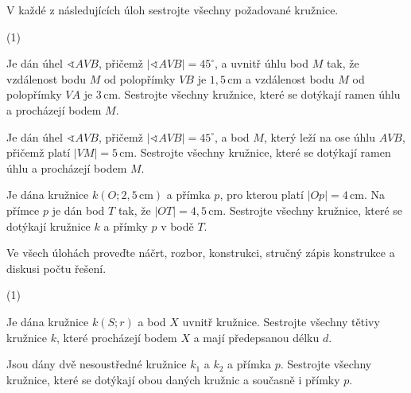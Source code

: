\documentclass[12pt,a4paper]{article}
\begin{document}

\begin{exercise}

    V každé z následujících úloh sestrojte všechny požadované kružnice.

    \begin{tasks}(1)

        \task Je dán úhel $\sphericalangle AVB$, přičemž $|\sphericalangle AVB|=45^\circ$, a uvnitř úhlu bod $M$ tak, že vzdálenost bodu $M$ od polopřímky $VB$ je $1{,}5\,\mathrm{cm}$ a vzdálenost bodu $M$ od polopřímky $VA$ je $3\,\mathrm{cm}$.
        Sestrojte všechny kružnice, které se dotýkají ramen úhlu a procházejí bodem $M$.

        \task Je dán úhel $\sphericalangle AVB$, přičemž $|\sphericalangle AVB|=45^\circ$, a bod $M$, který leží na ose úhlu $AVB$, přičemž platí $|VM|=5\,\mathrm{cm}$.
        Sestrojte všechny kružnice, které se dotýkají ramen úhlu a procházejí bodem $M$.

        \task Je dána kružnice $k(O;2{,}5\,\mathrm{cm})$ a přímka $p$, pro kterou platí $|Op|=4\,\mathrm{cm}$.
        Na přímce $p$ je dán bod $T$ tak, že $|OT|=4{,}5\,\mathrm{cm}$. Sestrojte všechny kružnice, které se dotýkají kružnice $k$ a přímky $p$ v bodě $T$.

    \end{tasks}

\end{exercise}



\begin{exercise}

    Ve všech úlohách proveďte náčrt, rozbor, konstrukci, stručný zápis konstrukce a diskusi počtu řešení.

    \begin{tasks}(1)

        \task Je dána kružnice $k(S;r)$ a bod $X$ uvnitř kružnice. Sestrojte všechny tětivy kružnice $k$, které procházejí bodem $X$ a mají předepsanou délku $d$.

        \task Jsou dány dvě nesoustředné kružnice $k_1$ a $k_2$ a přímka $p$. Sestrojte všechny kružnice, které se dotýkají obou daných kružnic a současně i přímky $p$.

    \end{tasks}

\end{exercise}
\end{document}
